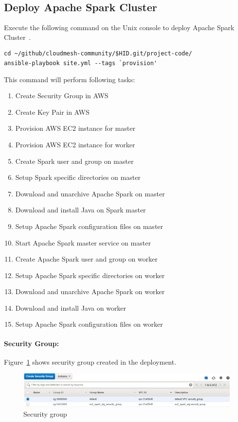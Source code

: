 \subsection{Deploy Apache Spark Cluster}

Execute the following command on the Unix console to deploy Apache
Spark Cluster~\cite{hid-sp18-511-www-spark}.

\begin{verbatim}
cd ~/github/cloudmesh-community/$HID.git/project-code/
ansible-playbook site.yml --tags `provision'
\end{verbatim}

This command will perform following tasks:

\begin{enumerate}
	\item Create Security Group in AWS
	\item Create Key Pair in AWS
	\item Provision AWS EC2 instance for master
	\item Provision AWS EC2 instance for worker
	\item Create Spark user and group on master
	\item Setup Spark specific directories on master
	\item Download and unarchive Apache Spark on master
	\item Download and install Java on Spark master
	\item Setup Apache Spark configuration files on master
	\item Start Apache Spark master service on master
	\item Create Apache Spark user and group on worker
	\item Setup Apache Spark specific directories on worker
	\item Download and unarchive Apache Spark on worker
	\item Download and install Java  on worker
	\item Setup Apache Spark configuration files on worker
\end{enumerate}

\paragraph{Security Group:}

Figure~\ref{f:security-group} shows security group created in the deployment.

\begin{figure}[!ht]
	\centering\includegraphics[width=\columnwidth]{images/securitygroup.png}
	\caption{Security group}\label{f:security-group}
\end{figure}

